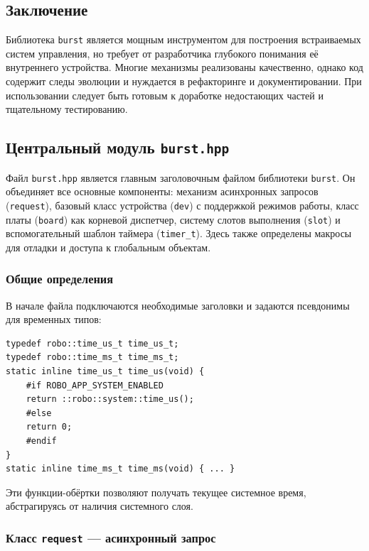 \documentclass[a4paper,12pt]{article}
\begin{document}
\subsection{Заключение}

Библиотека \texttt{burst} является мощным инструментом для построения встраиваемых систем управления, но требует от разработчика глубокого понимания её внутреннего устройства. Многие механизмы реализованы качественно, однако код содержит следы эволюции и нуждается в рефакторинге и документировании. При использовании следует быть готовым к доработке недостающих частей и тщательному тестированию.

\subsection{Центральный модуль \texttt{burst.hpp}}

Файл \texttt{burst.hpp} является главным заголовочным файлом библиотеки \texttt{burst}. Он объединяет все основные компоненты: механизм асинхронных запросов (\texttt{request}), базовый класс устройства (\texttt{dev}) с поддержкой режимов работы, класс платы (\texttt{board}) как корневой диспетчер, систему слотов выполнения (\texttt{slot}) и вспомогательный шаблон таймера (\texttt{timer\_t}). Здесь также определены макросы для отладки и доступа к глобальным объектам.

\subsubsection{Общие определения}

В начале файла подключаются необходимые заголовки и задаются псевдонимы для временных типов:

\begin{lstlisting}[caption={Time type aliases}]
typedef robo::time_us_t time_us_t;
typedef robo::time_ms_t time_ms_t;
static inline time_us_t time_us(void) {
    #if ROBO_APP_SYSTEM_ENABLED
    return ::robo::system::time_us();
    #else
    return 0;
    #endif
}
static inline time_ms_t time_ms(void) { ... }
\end{lstlisting}

Эти функции-обёртки позволяют получать текущее системное время, абстрагируясь от наличия системного слоя.

\subsubsection{Класс \texttt{request} — асинхронный запрос}
\end{document}
